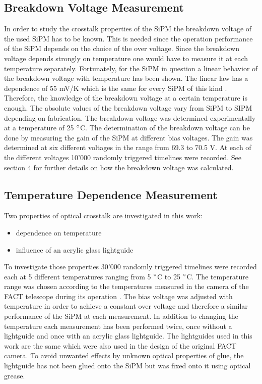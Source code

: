 \documentclass[10pt,a4paper]{article}
\begin{document}
\begin{multicols}{2}
\subsection{Breakdown Voltage Measurement}
In order to study the crosstalk properties of the SiPM the breakdown voltage of the used SiPM has to be known. This is needed since the operation performance of the SiPM depends on the choice of the over voltage. Since the breakdown voltage depends strongly on temperature one would have to measure it at each temperature separately. Fortunately, for the SiPM in question a linear behavior of the breakdown voltage with temperature has been shown. The linear law has a dependence of 55 mV/K which is the same for every SiPM of this kind \cite{gapd}. Therefore, the knowledge of the breakdown voltage at a certain temperature is enough. The absolute values of the breakdown voltage vary from SiPM to SIPM depending on fabrication. The breakdown voltage was determined experimentally at a temperature of 25 $\degree$C. The determination of the breakdown voltage can be done by measuring the gain of the SiPM at different bias voltages. The gain was determined at six different voltages in the range from 69.3 to 70.5 V. At each of the different voltages 10'000 randomly triggered timelines were recorded. See section 4 for further details on how the breakdown voltage was calculated.

\subsection{Temperature Dependence Measurement}
Two properties of optical crosstalk are investigated in this work:
\begin{itemize}
\item dependence on temperature
\item influence of an acrylic glass lightguide
\end{itemize} 
To investigate those properties 30'000 randomly triggered timelines were recorded each at 5 different temperatures ranging from 5 $\degree$C to 25 $\degree$C. The temperature range was chosen according to the temperatures measured in the camera of the FACT telescope during its operation \cite{fact}. The bias voltage was adjusted with temperature in order to achieve a constant over voltage and therefore a similar performance of the SiPM at each measurement. In addition to changing the temperature each measurement has been performed twice, once without a lightguide and once with an acrylic glass lightguide. The lightguides used in this work are the same which were also used in the design of the original FACT camera. To avoid unwanted effects by unknown optical properties of glue, the lightguide has not been glued onto the SiPM but was fixed onto it using optical grease. 


\end{multicols}
\end{document}
